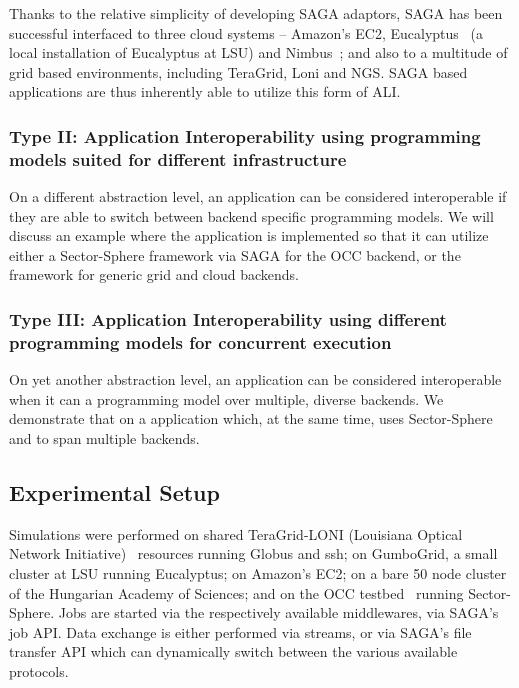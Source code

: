 \documentclass[3p,twocolumn]{elsarticle}
\begin{document}
Thanks to the relative simplicity of developing SAGA adaptors, SAGA
has been successful interfaced to three cloud systems -- Amazon's
EC2, Eucalyptus~\cite{eucalyptus} (a local installation of Eucalyptus
at LSU) and Nimbus~\cite{nimbus};  and also to a multitude of grid
based environments, including TeraGrid, Loni and NGS.  SAGA based
applications are thus inherently able to utilize this form of ALI.


\subsubsection{Type II: Application Interoperability using programming
  models suited for different infrastructure}
%
%
On a different abstraction level, an application can be considered
interoperable if they are able to switch between backend specific
programming models.  We will discuss an example where the \wc
application is implemented so that it can utilize either a
Sector-Sphere framework via SAGA for the OCC backend, or the \smr
framework for generic grid and cloud backends.


\subsubsection{Type III: Application Interoperability using different
  programming models for concurrent execution}
%
%
On yet another abstraction level, an application can be considered
interoperable when it can  a programming model over
multiple, diverse backends.  We demonstrate that on a \wc
application which, at the same time, uses Sector-Sphere and \smr
to span multiple backends.
            

\subsection{Experimental Setup}

Simulations were performed on shared TeraGrid-LONI (Louisiana Optical
Network Initiative)~\cite{loni-url} resources running Globus and ssh;
on GumboGrid, a small cluster at LSU running Eucalyptus; on Amazon's
EC2; on a bare 50 node cluster of the Hungarian Academy of Sciences;
and on the OCC testbed~\cite{occ_testbed} running Sector-Sphere.  Jobs
are started via the respectively available middlewares, via SAGA's job
API.  Data exchange is either performed via streams, or  via SAGA's
file transfer API which can dynamically switch between the various
available protocols.
\end{document}
